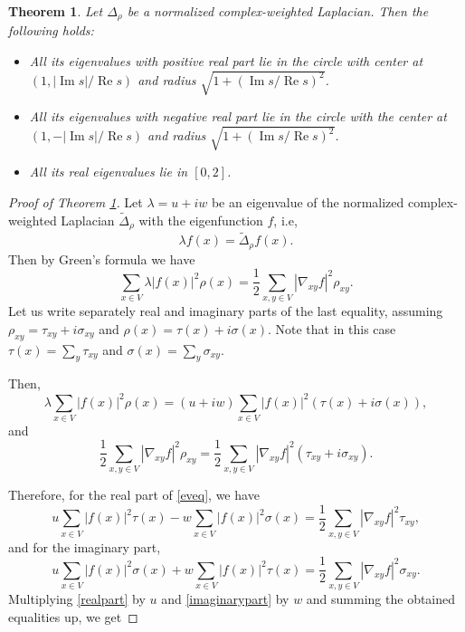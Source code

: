 \documentclass[10pt,a4paper]{amsart}
\newtheorem{theorem}{Theorem}
\renewcommand{\Im}{\operatorname{Im}}%
\renewcommand{\Re}{\operatorname{Re}}%
\begin{document}
\begin{theorem}
\label{thm:CircleRegions}
Let $\Delta_\rho$ be a normalized complex-weighted Laplacian. Then the following holds:
\begin{itemize}
\item
All its eigenvalues with positive real part lie in the circle with center at $(1,|\Im s|/\Re s)$ and radius $\sqrt {1+(\Im s/\Re s)^2}$.
\item
All its eigenvalues with negative real part lie in the circle with the center at $(1,-|\Im s|/\Re s)$ and radius $\sqrt {1+(\Im s/\Re s)^2}$.
\item
All its real eigenvalues lie in $[0,2]$.
\end{itemize}
\end{theorem}

\begin{proof}[Proof of Theorem \ref{thm:CircleRegions}]
Let ${\lambda=u+iw}$ be an eigenvalue of the normalized complex-weighted Laplacian $\widetilde \Delta_\rho$ with the eigenfunction $f$, i.e, 
\begin{equation*}
\lambda f(x)=\widetilde \Delta_\rho f(x).
\end{equation*}
Then by Green's formula we have
\begin{equation}\label{eveq}
\sum_{x\in V}\lambda|f(x)|^2\rho(x)=\dfrac{1}{2}\sum_{x,y\in V}|\nabla_{xy}f|^2\rho_{xy}.
\end{equation}
Let us write separately real and imaginary parts of the last equality, assuming  ${\rho_{xy}=\tau_{xy}+i\sigma_{xy}}$ and ${\rho(x)=\tau(x)+i\sigma(x)}$. Note that in this case $\tau(x)=\sum_{y}\tau_{xy}$ and $\sigma(x)=\sum_{y}\sigma_{xy}$. 

Then,
\begin{equation*}
\lambda\sum_{x\in V}|f(x)|^2\rho(x)=(u+iw)\sum_{x\in V}|f(x)|^2(\tau(x)+i\sigma(x)),
\end{equation*}
and
\begin{equation*}
\dfrac{1}{2}\sum_{x,y\in V}|\nabla_{xy}f|^2\rho_{xy}=\dfrac{1}{2}\sum_{x,y\in V}|\nabla_{xy}f|^2(\tau_{xy}+i\sigma_{xy}).
\end{equation*}


Therefore, for the real part of \eqref{eveq}, we have
\begin{equation}\label{realpart}
u\sum_{x\in V}|f(x)|^2\tau(x)-w\sum_{x\in V}|f(x)|^2\sigma(x)=\dfrac{1}{2}\sum_{x,y\in V}|\nabla_{xy}f|^2\tau_{xy},
\end{equation}
and for the imaginary part,
\begin{equation}\label{imaginarypart}
u\sum_{x\in V}|f(x)|^2\sigma(x)+w\sum_{x\in V}|f(x)|^2\tau(x)=\dfrac{1}{2}\sum_{x,y\in V}|\nabla_{xy}f|^2\sigma_{xy}.
\end{equation}
Multiplying \eqref{realpart} by $u$ and \eqref{imaginarypart} by $w$ and summing the obtained equalities up, we get


\end{proof}
\end{document}
